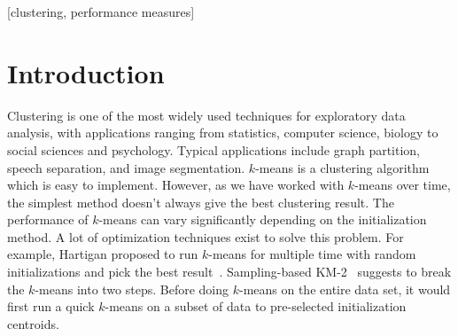 \documentclass{acm_proc_article-sp}
\begin{document}
[clustering, performance measures]


\section{Introduction}
Clustering is one of the most widely used techniques for exploratory data analysis,  with applications ranging from statistics, computer science, biology to social sciences and psychology. Typical applications include graph partition, speech separation, and image segmentation. $k$-means is a  
clustering algorithm which is easy to implement. However, as we have worked with $k$-means over time, the simplest method doesn't always give the best clustering result. The performance of $k$-means can vary significantly depending on the initialization method. A lot of optimization techniques exist to solve this problem. For example, Hartigan proposed to run $k$-means for multiple time with random initializations and pick the best result~\cite{hartigan1979algorithm}. Sampling-based KM-2~\cite{yan2009fast} suggests to break the $k$-means into two steps. Before doing $k$-means on the entire data set, it would first run a quick $k$-means on a subset of data to pre-selected initialization centroids. 
\end{document}
